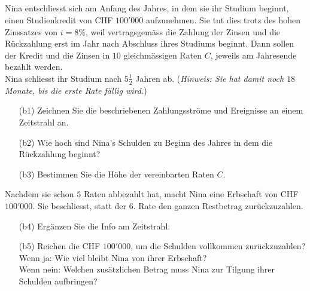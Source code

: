 \subsection*{}
Nina entschliesst sich am Anfang des Jahres, in dem sie ihr Studium beginnt, einen Studienkredit
von CHF $ 100'000 $ aufzunehmen. Sie tut dies trotz des hohen Zinssatzes von $ i = 8 \% $, weil
vertragsgemäss die Zahlung der Zinsen und die Rückzahlung erst im Jahr nach Abschluss ihres
Studiums beginnt.
Dann sollen der Kredit und die Zinsen in $ 10  $ gleichmässigen Raten $ C $, jeweils am Jahresende bezahlt werden.\\
Nina schliesst ihr Studium nach $ 5\frac{1}{2} $ Jahren ab. (\textit{Hinweis: Sie hat damit noch $ 18  $ Monate, bis die erste Rate fällig wird.})
\begin{enumerate}
	\item[(b1)]
	Zeichnen Sie die beschriebenen Zahlungsströme und Ereignisse an einem Zeitstrahl an.
	\item[(b2)] 
	Wie hoch sind Nina's Schulden zu Beginn des Jahres in dem die Rückzahlung beginnt?
	\item[(b3)] 
	Bestimmen Sie die Höhe der vereinbarten Raten $ C $.
\end{enumerate}
Nachdem sie schon $ 5 $ Raten abbezahlt hat, macht Nina eine Erbschaft von CHF $ 100'000 $.
Sie beschliesst, statt der $ 6. $ Rate den ganzen Restbetrag zurückzuzahlen.
\begin{enumerate}
	\item[(b4)] 
	Ergänzen Sie die Info am Zeitstrahl.
	\item[(b5)] 
	Reichen die CHF $ 100'000 $, um die Schulden vollkommen zurückzuzahlen?\\
	Wenn ja: Wie viel bleibt Nina von ihrer Erbschaft?\\
	Wenn nein: Welchen zusätzlichen Betrag muss Nina zur Tilgung ihrer Schulden aufbringen?
\end{enumerate}

